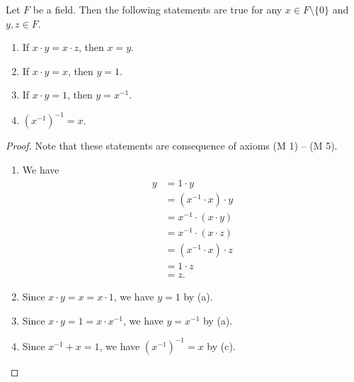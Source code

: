 \begin{theorem}
  Let $F$ be a field.
  Then the following statements are true for any $x \in F \setminus \{0\}$
  and $y, z \in F$.
  \begin{enumerate}
    \item If $x \cdot y = x \cdot z$, then $x = y$.
    \item If $x \cdot y = x$, then $y = 1$.
    \item If $x \cdot y = 1$, then $y = x^{-1}$.
    \item $(x^{-1})^{-1} = x$.
  \end{enumerate}
\end{theorem}
\begin{proof}
  Note that these statements are consequence of axioms (M 1) -- (M 5).
  \begin{enumerate}
    \item We have
    \begin{align*}
      y
      &= 1 \cdot y \\
      &= (x^{-1} \cdot x) \cdot y \\
      &= x^{-1} \cdot (x \cdot y) \\
      &= x^{-1} \cdot (x \cdot z) \\
      &= (x^{-1} \cdot x) \cdot z \\
      &= 1 \cdot z \\
      &= z.
    \end{align*}
    \item Since $x \cdot y = x = x \cdot 1$, we have $y = 1$ by (a).
    \item Since $x \cdot y = 1 = x \cdot x^{-1}$, we have $y = x^{-1}$ by (a).
    \item Since $x^{-1} + x = 1$, we have $(x^{-1})^{-1} = x$ by (c). \qedhere
  \end{enumerate}
\end{proof}

